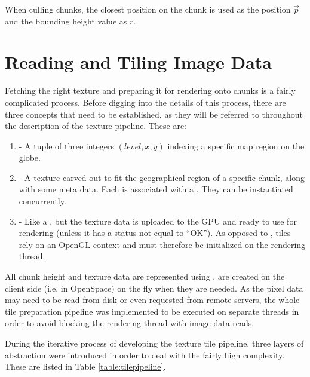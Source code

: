 When culling chunks, the closest position on the chunk is used as the position $\vec{p}$ and the bounding height value as $r$.

\section{Reading and Tiling Image Data}
Fetching the right texture and preparing it for rendering onto chunks is a fairly complicated process. Before digging into the details of this process, there are three concepts that need to be established, as they will be referred to throughout the description of the texture pipeline. These are:

\begin{enumerate}
	\item \textbf{} - A tuple of three integers $(level, x, y)$ indexing a specific map region on the globe.
	\item \textbf{} - A texture carved out to fit the geographical region of a specific chunk, along with some meta data. Each  is associated with a . They can be instantiated concurrently.
	\item \textbf{} - Like a , but the texture data is uploaded to the GPU and ready to use for rendering (unless it has a status not equal to ``OK''). As opposed to , tiles rely on an OpenGL context and must therefore be initialized on the rendering thread.
\end{enumerate}

All chunk height and texture data are represented using .  are created on the client side (i.e. in OpenSpace) on the fly when they are needed. As the pixel data may need to be read from disk or even requested from remote servers, the whole tile preparation pipeline was implemented to be executed on separate threads in order to avoid blocking the rendering thread with image data reads. 

During the iterative process of developing the texture tile pipeline, three layers of abstraction were introduced in order to deal with the fairly high complexity. These are listed in Table \ref{table:tilepipeline}.

